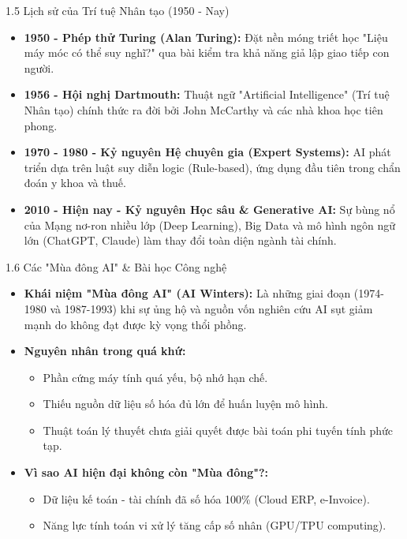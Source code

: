 \documentclass[aspectratio=169]{beamer}
\begin{document}
\begin{frame}{1.5 Lịch sử của Trí tuệ Nhân tạo (1950 - Nay)}
    \begin{itemize}
        \item \textbf{1950 - Phép thử Turing (Alan Turing):} Đặt nền móng triết học "Liệu máy móc có thể suy nghĩ?" qua bài kiểm tra khả năng giả lập giao tiếp con người.
        \item \textbf{1956 - Hội nghị Dartmouth:} Thuật ngữ "Artificial Intelligence" (Trí tuệ Nhân tạo) chính thức ra đời bởi John McCarthy và các nhà khoa học tiên phong.
        \item \textbf{1970 - 1980 - Kỷ nguyên Hệ chuyên gia (Expert Systems):} AI phát triển dựa trên luật suy diễn logic (Rule-based), ứng dụng đầu tiên trong chẩn đoán y khoa và thuế.
        \item \textbf{2010 - Hiện nay - Kỷ nguyên Học sâu \& Generative AI:} Sự bùng nổ của Mạng nơ-ron nhiều lớp (Deep Learning), Big Data và mô hình ngôn ngữ lớn (ChatGPT, Claude) làm thay đổi toàn diện ngành tài chính.
    \end{itemize}
\end{frame}

\begin{frame}{1.6 Các "Mùa đông AI" \& Bài học Công nghệ}
    \begin{itemize}
        \item \textbf{Khái niệm "Mùa đông AI" (AI Winters):} Là những giai đoạn (1974-1980 và 1987-1993) khi sự ủng hộ và nguồn vốn nghiên cứu AI sụt giảm mạnh do không đạt được kỳ vọng thổi phồng.
        \item \textbf{Nguyên nhân trong quá khứ:}
        \begin{itemize}
            \item Phần cứng máy tính quá yếu, bộ nhớ hạn chế.
            \item Thiếu nguồn dữ liệu số hóa đủ lớn để huấn luyện mô hình.
            \item Thuật toán lý thuyết chưa giải quyết được bài toán phi tuyến tính phức tạp.
        \end{itemize}
        \item \textbf{Vì sao AI hiện đại không còn "Mùa đông"?:}
        \begin{itemize}
            \item Dữ liệu kế toán - tài chính đã số hóa 100\% (Cloud ERP, e-Invoice).
            \item Năng lực tính toán vi xử lý tăng cấp số nhân (GPU/TPU computing).
        \end{itemize}
    \end{itemize}
\end{frame}
\end{document}
